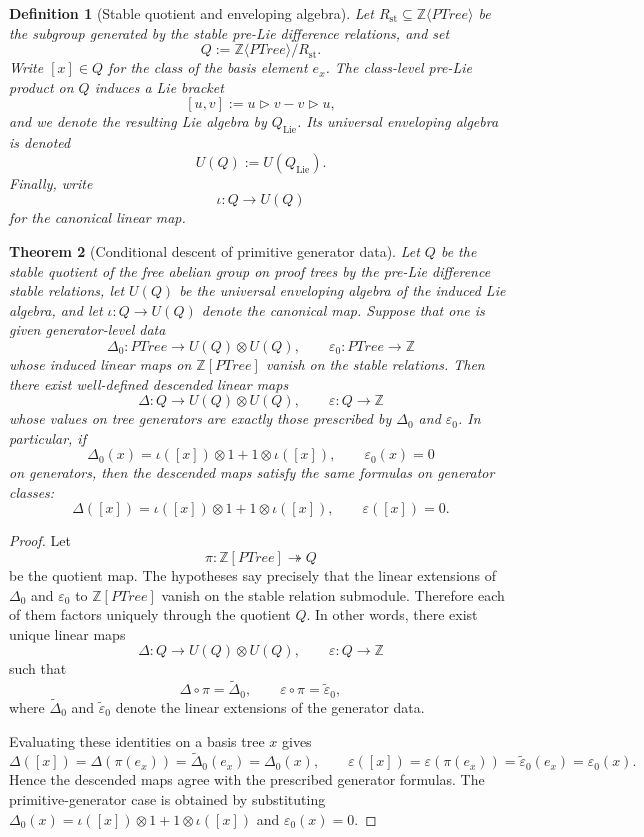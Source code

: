 \documentclass[11pt]{article}
\newtheorem{theorem}{Theorem}
\newtheorem{definition}[theorem]{Definition}
\newcommand{\PTree}{\mathit{PTree}}
\newcommand{\ZZ}{\mathbb{Z}}
\begin{document}
\begin{definition}[Stable quotient and enveloping algebra]
Let \(R_{\mathrm{st}}\subseteq \ZZ\langle\PTree\rangle\) be the subgroup
generated by the stable pre-Lie difference relations, and set
\[
Q:=\ZZ\langle\PTree\rangle / R_{\mathrm{st}}.
\]
Write \([x]\in Q\) for the class of the basis element \(e_x\). The
class-level pre-Lie product on \(Q\) induces a Lie bracket
\[
[u,v]:=u\triangleright v-v\triangleright u,
\]
and we denote the resulting Lie algebra by \(Q_{\mathrm{Lie}}\). Its
universal enveloping algebra is denoted
\[
U(Q):=U(Q_{\mathrm{Lie}}).
\]
Finally, write
\[
\iota:Q\to U(Q)
\]
for the canonical linear map.
\end{definition}

\begin{theorem}[Conditional descent of primitive generator data]
Let \(Q\) be the stable quotient of the free abelian group on proof trees by
the pre-Lie difference stable relations, let \(U(Q)\) be the universal
enveloping algebra of the induced Lie algebra, and let
\(\iota:Q\to U(Q)\) denote the canonical map. Suppose that one is given
generator-level data
\[
\Delta_0:\PTree\to U(Q)\otimes U(Q),
\qquad
\varepsilon_0:\PTree\to \mathbb Z
\]
whose induced linear maps on \(\mathbb Z[\PTree]\) vanish on the stable
relations. Then there exist well-defined descended linear maps
\[
\Delta:Q\to U(Q)\otimes U(Q),
\qquad
\varepsilon:Q\to \mathbb Z
\]
whose values on tree generators are exactly those prescribed by
\(\Delta_0\) and \(\varepsilon_0\). In particular, if
\[
\Delta_0(x)=\iota([x])\otimes 1 + 1\otimes \iota([x]),
\qquad
\varepsilon_0(x)=0
\]
on generators, then the descended maps satisfy the same formulas on generator
classes:
\[
\Delta([x])=\iota([x])\otimes 1 + 1\otimes \iota([x]),
\qquad
\varepsilon([x])=0.
\]
\end{theorem}

\begin{proof}
Let
\[
\pi:\mathbb Z[\PTree]\twoheadrightarrow Q
\]
be the quotient map. The hypotheses say precisely that the linear extensions of
\(\Delta_0\) and \(\varepsilon_0\) to \(\mathbb Z[\PTree]\) vanish on the
stable relation submodule. Therefore each of them factors uniquely through the
quotient \(Q\). In other words, there exist unique linear maps
\[
\Delta:Q\to U(Q)\otimes U(Q),
\qquad
\varepsilon:Q\to \mathbb Z
\]
such that
\[
\Delta\circ \pi = \widetilde{\Delta}_0,
\qquad
\varepsilon\circ \pi = \widetilde{\varepsilon}_0,
\]
where \(\widetilde{\Delta}_0\) and \(\widetilde{\varepsilon}_0\) denote the
linear extensions of the generator data.

Evaluating these identities on a basis tree \(x\) gives
\[
\Delta([x])=\Delta(\pi(e_x))=\widetilde{\Delta}_0(e_x)=\Delta_0(x),
\qquad
\varepsilon([x])=\varepsilon(\pi(e_x))=\widetilde{\varepsilon}_0(e_x)
=\varepsilon_0(x).
\]
Hence the descended maps agree with the prescribed generator formulas. The
primitive-generator case is obtained by substituting
\(\Delta_0(x)=\iota([x])\otimes 1+1\otimes \iota([x])\) and
\(\varepsilon_0(x)=0\).
\end{proof}
\end{document}
